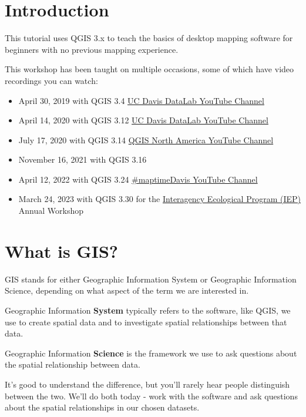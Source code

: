 \documentclass[
]{article}
\providecommand{\tightlist}{%
  \setlength{\itemsep}{0pt}\setlength{\parskip}{0pt}}
\begin{document}
\hypertarget{introduction}{%
\section{Introduction}\label{introduction}}

This tutorial uses QGIS 3.x to teach the basics of desktop mapping software for beginners with no previous mapping experience.

This workshop has been taught on multiple occasions, some of which have video recordings you can watch:

\begin{itemize}
\tightlist
\item
  April 30, 2019 with QGIS 3.4 \href{https://www.youtube.com/watch?v=avscRlskV2E\&t=1s}{UC Davis DataLab YouTube Channel}
\item
  April 14, 2020 with QGIS 3.12 \href{https://www.youtube.com/watch?v=XnabNKLop7c}{UC Davis DataLab YouTube Channel}
\item
  July 17, 2020 with QGIS 3.14 \href{https://www.youtube.com/channel/UCLQd1MsyWWPoIi6rNLUCjhg}{QGIS North America YouTube Channel}
\item
  November 16, 2021 with QGIS 3.16
\item
  April 12, 2022 with QGIS 3.24 \href{https://youtu.be/PAcZUPSmqDE}{\#maptimeDavis YouTube Channel}
\item
  March 24, 2023 with QGIS 3.30 for the \href{https://iep.ca.gov/}{Interagency Ecological Program (IEP)} Annual Workshop
\end{itemize}

\hypertarget{what-is-gis}{%
\section{What is GIS?}\label{what-is-gis}}

GIS stands for either Geographic Information System or Geographic Information Science, depending on what aspect of the term we are interested in.

Geographic Information \textbf{System} typically refers to the software, like QGIS, we use to create spatial data and to investigate spatial relationships between that data.

Geographic Information \textbf{Science} is the framework we use to ask questions about the spatial relationship between data.

It's good to understand the difference, but you'll rarely hear people distinguish between the two. We'll do both today - work with the software and ask questions about the spatial relationships in our chosen datasets.
\end{document}
